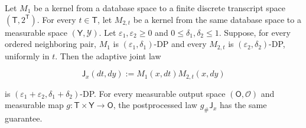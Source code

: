 \begin{lemma}\label{lem:step-011-adaptive-composition}
Let \(M_1\) be a kernel from a database space to a finite discrete
transcript space \((\mathsf T,2^{\mathsf T})\). For every
\(t\in\mathsf T\), let \(M_{2,t}\)
be a kernel from the same database space to a measurable space
\((\mathsf Y,\mathcal Y)\). Let \(\varepsilon_1,\varepsilon_2\geq0\) and
\(0\leq\delta_1,\delta_2\leq1\). Suppose, for every ordered neighboring pair,
\(M_1\) is \((\varepsilon_1,\delta_1)\)-DP and every \(M_{2,t}\) is
\((\varepsilon_2,\delta_2)\)-DP, uniformly in \(t\). Then the adaptive joint
law

\[
 \mathsf J_x(dt,dy):=M_1(x,dt)M_{2,t}(x,dy)
\tag{22}
\]

is
\((\varepsilon_1+\varepsilon_2,\delta_1+\delta_2)\)-DP. For every
measurable output space \((\mathsf O,\mathcal O)\) and measurable map
\(g:\mathsf T\times\mathsf Y\to\mathsf O\), the
postprocessed law \(g_\#\mathsf J_x\) has the same guarantee.


\end{lemma}

